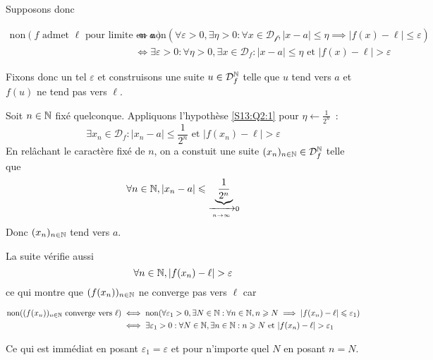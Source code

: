 \documentclass{article}
\begin{document}
\begin{question_kholle}
\begin{itemize}[label=$\star$]
		      Supposons donc

		      \begin{align}
			      \mathrm{non}(f \text{ admet }\ell \text{ pour limite en }a) & \iff \mathrm{non}(\forall \varepsilon>0, \exists \eta >0 : \forall x \in \mathcal{D_{f}}, \lvert x -a\rvert \leqslant \eta \implies \lvert f(x) - \ell \rvert\leqslant \varepsilon  ) \\
			                                                                  & \iff \exists \varepsilon>0 : \forall \eta >0, \exists x \in \mathcal{D}_{f} : \lvert x-a \rvert \leqslant \eta \text{ et } \lvert f(x) - \ell \rvert  > \varepsilon \label{S13:Q2:1}
		      \end{align}


		      Fixons donc un tel $\varepsilon$ et construisons une suite $u \in \mathcal{D}_{f}^{\mathbb N}$ telle que $u$ tend vers $a$ et $f(u)$ ne tend pas vers $\ell$.

		      Soit $n \in \mathbb N$ fixé quelconque. Appliquons l'hypothèse \eqref{S13:Q2:1} pour $\eta \leftarrow \frac{1}{2^{n}}$~:
		      $$
			      \exists x_{n} \in \mathcal{D}_{f} : \lvert x_{n} - a \rvert  \leqslant \frac{1}{2^{n}} \text{ et } \lvert f(x_{n}) - \ell \rvert  > \varepsilon
		      $$
		      En relâchant le caractère fixé de $n$, on a constuit une suite $(x_{n})_{n \in \mathbb N} \in \mathcal{D}_{f}^{\mathbb N}$ telle que
		      $$
			      \forall n \in \mathbb N, \lvert x_{n} - a \rvert \leqslant \underbrace{ \frac{1}{2^{n}} }_{ \xrightarrow[n \to \infty]{} 0}
		      $$
		      Donc $(x_{n})_{n \in \mathbb N}$ tend vers $a$.

		      La suite vérifie aussi
		      $$
			      \forall n \in \mathbb N, \lvert f(x_{n}) - \ell \rvert > \varepsilon
		      $$
		      ce qui montre que $(f(x_{n}))_{n \in \mathbb N}$ ne converge pas vers $\ell$ car

		      \begin{align*}
			      \text{non}((f(x_{n}))_{n \in \mathbb N} \text{ converge vers } \ell) & \iff \mathrm{non}(\forall \varepsilon_{1}>0, \exists N \in \mathbb N : \forall n \in \mathbb N, n \geqslant N \implies \lvert f(x_{n}) - \ell \rvert \leqslant \varepsilon_{1}) \\
			                                                                    & \iff \exists \varepsilon_{1}>0: \forall N \in \mathbb N, \exists n  \in \mathbb N : n\geqslant N \text{ et } \lvert f(x_{n}) - \ell \rvert  > \varepsilon_{1}
		      \end{align*}

		      Ce qui est immédiat en posant $\varepsilon_{1} = \varepsilon$ et pour n'importe quel $N$ en posant $n = N$.
	\end{itemize}
\end{question_kholle}
\end{document}
